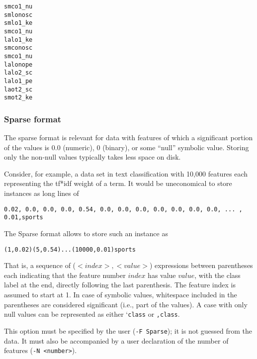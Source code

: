 \documentclass{report}
\begin{document}
\begin{footnotesize}
\begin{verbatim}
smco1_nu
smlonosc
smlo1_ke
smco1_nu
lalo1_ke
smconosc
smco1_nu
lalonope
lalo2_sc
lalo1_pe
laot2_sc
smot2_ke
\end{verbatim}
\end{footnotesize}

\subsubsection{Sparse format}

The sparse format is relevant for data with features of which a
significant portion of the values is $0.0$ (numeric), $0$ (binary), or
some ``null'' symbolic value. Storing only the non-null values
typically takes less space on disk.

Consider, for example, a data set in text classification with 10,000
features each representing the tf*idf weight of a term. It would be
uneconomical to store instances as long lines of

\begin{footnotesize}
\begin{verbatim}
0.02, 0.0, 0.0, 0.0, 0.54, 0.0, 0.0, 0.0, 0.0, 0.0, 0.0, 0.0, ... , 0.01,sports
\end{verbatim}
\end{footnotesize}

The Sparse format allows to store such an instance as

\begin{footnotesize}
\begin{verbatim}
(1,0.02)(5,0.54)...(10000,0.01)sports
\end{verbatim}
\end{footnotesize}

That is, a sequence of ($<index>,<value>$) expressions between
parentheses each indicating that the feature number $index$ has value
$value$, with the class label at the end, directly following the last
parenthesis. The feature index is assumed to start at 1. In case of
symbolic values, whitespace included in the parentheses are considered
significant (i.e., part of the values). A case with only null values
can be represented as either `{\tt class} or {\tt ,class}.

This option must be specified by the user ({\tt -F Sparse}); it is not
guessed from the data. It must also be accompanied by a user
declaration of the number of features ({\tt -N <number>}).
\end{document}

